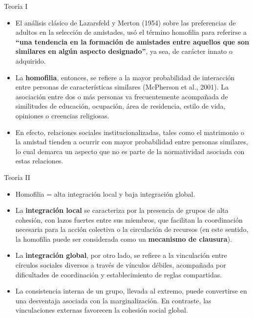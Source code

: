 \documentclass[
  8pt,
  ignorenonframetext,
]{beamer}
\begin{document}
\begin{frame}{Teoría I}
\protect\hypertarget{teoruxeda-i}{}
\begin{itemize}
\item
  El análisis clásico de Lazarsfeld y Merton (1954) sobre las
  preferencias de adultos en la selección de amistades, usó el término
  homofilia para referirse a \textbf{``una tendencia en la formación de
  amistades entre aquellos que son similares en algún aspecto
  designado''}, ya sea, de carácter innato o adquirido.
\item
  La \textbf{homofilia}, entonces, se refiere a la mayor probabilidad de
  interacción entre personas de características similares (McPherson et
  al., 2001). La asociación entre dos o más personas va frecuentemente
  acompañada de similitudes de educación, ocupación, área de residencia,
  estilo de vida, opiniones o creencias religiosas.
\item
  En efecto, relaciones sociales institucionalizadas, tales como el
  matrimonio o la amistad tienden a ocurrir con mayor probabilidad entre
  personas similares, lo cual demarca un aspecto que no es parte de la
  normatividad asociada con estas relaciones.
\end{itemize}
\end{frame}

\begin{frame}{Teoría II}
\protect\hypertarget{teoruxeda-ii}{}
\begin{itemize}
\item
  Homofilia = alta integración local y baja integración global.
\item
  La \textbf{integración local} se caracteriza por la presencia de
  grupos de alta cohesión, con lazos fuertes entre sus miembros, que
  facilitan la coordinación necesaria para la acción colectiva o la
  circulación de recursos (en este sentido, la homofilia puede ser
  considerada como un \textbf{mecanismo de clausura}).
\item
  La \textbf{integración global}, por otro lado, se refiere a la
  vinculación entre círculos sociales diversos a través de vínculos
  débiles, acompañada por dificultades de coordinación y establecimiento
  de reglas compartidas.
\item
  La consistencia interna de un grupo, llevada al extremo, puede
  convertirse en una desventaja asociada con la marginalización. En
  contraste, las vinculaciones externas favorecen la cohesión social
  global.
\end{itemize}
\end{frame}
\end{document}
